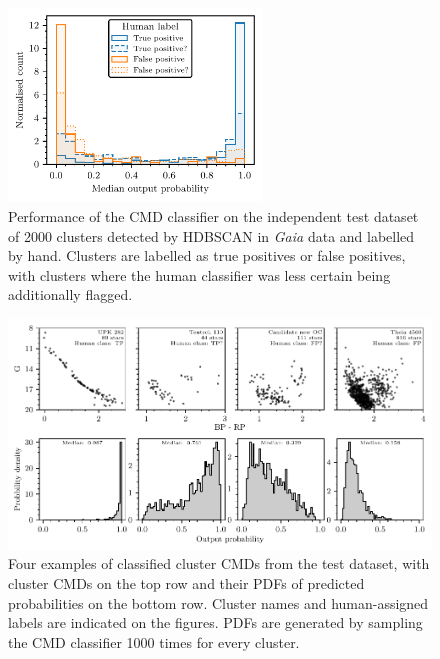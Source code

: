 \begin{figure}[t]
   \centering
   \includegraphics[width=0.6\textwidth]{fig/c3/fig_classifier_test_performance.pdf}
   \caption[Performance of the CMD classifier on the independent test dataset of 2000 clusters detected by HDBSCAN in \emph{Gaia} data and labelled by hand]{Performance of the CMD classifier on the independent test dataset of 2000 clusters detected by HDBSCAN in \emph{Gaia} data and labelled by hand. Clusters are labelled as true positives or false positives, with clusters where the human classifier was less certain being additionally flagged.}%
   \label{c3:fig:classifier_test_results}
\end{figure}

\begin{figure}[t]
   \centering
   \includegraphics[width=\textwidth]{fig/c3/fig_classifier_examples.pdf}
   \caption[Four examples of classified cluster CMDs from the test dataset]{Four examples of classified cluster CMDs from the test dataset, with cluster CMDs on the top row and their PDFs of predicted probabilities on the bottom row. Cluster names and human-assigned labels are indicated on the figures. PDFs are generated by sampling the CMD classifier 1000 times for every cluster.}%
   \label{c3:fig:classifier_examples}
\end{figure}

